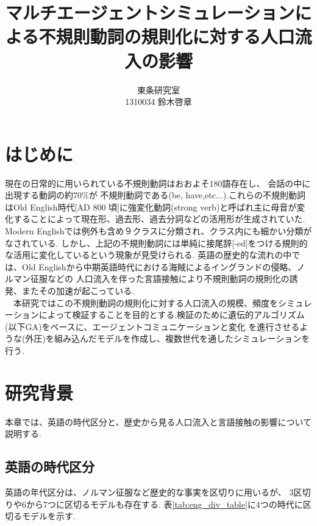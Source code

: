 \documentclass[10.5pt, a4j, twocolumn]{jsarticle}
\begin{document}
\title{マルチエージェントシミュレーションによる不規則動詞の規則化に対する人口流入の影響\\       }

\date{}
\author{東条研究室 \\ 1310034 鈴木啓章}

\maketitle %
\thispagestyle{fancy}


\section{はじめに}\label{sec:intro}
現在の日常的に用いられている不規則動詞はおおよそ180語存在し、
会話の中に出現する動詞の約70\%が
不規則動詞である(be, have,etc...)\cite{pinker}.これらの不規則動詞はOld English時代[AD 800 頃]に強変化動詞(strong verb)と呼ばれ主に母音が変化することによって現在形、過去形、過去分詞などの活用形が生成されていた.
Modern Englishでは例外も含め９クラスに分類され、クラス内にも細かい分類がなされている\cite{pinker2}.
しかし、上記の不規則動詞には単純に接尾辞[-ed]をつける規則的な活用に変化しているという現象が見受けられる.
英語の歴史的な流れの中では、Old Englishから中期英語時代における海賊によるイングランドの侵略、ノルマン征服などの
人口流入を伴った言語接触により不規則動詞の規則化の誘発、またその加速が起こっている.\\
　本研究ではこの不規則動詞の規則化に対する人口流入の規模、頻度をシミュレーションによって検証することを目的とする.検証のために遺伝的アルゴリズム\cite{iba_ga}(以下GA)をベースに、エージェントコミュニケーションと変化
を進行させるような(外圧)を組み込んだモデルを作成し、複数世代を通したシミュレーションを行う.

\section{研究背景}
本章では、英語の時代区分と、歴史から見る人口流入と言語接触の影響について説明する.
\subsection{英語の時代区分}
英語の年代区分は、ノルマン征服など歴史的な事実を区切りに用いるが、
3区切りや6から7つに区切るモデルも存在する.
表\ref{tab:eng_div_table}に4つの時代に区切るモデル\cite{english_div}を示す.
\end{document}
